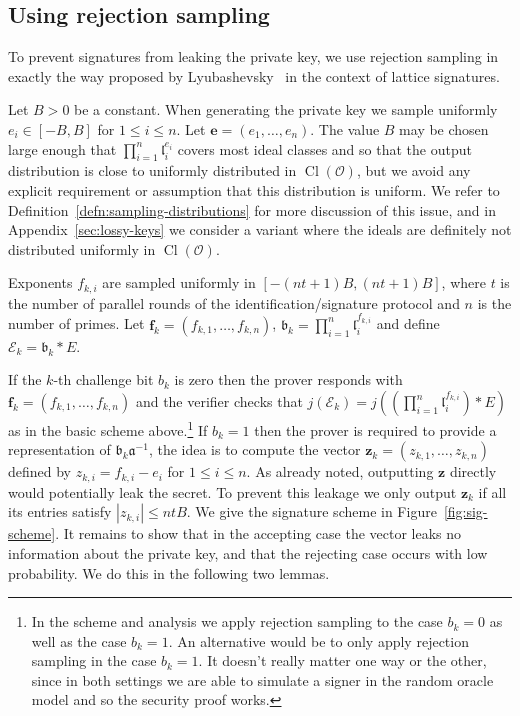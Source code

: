 \documentclass{llncs}
\newcommand{\E}{\mathcal{E}}
\newcommand{\OO}{\mathcal{O}}
\DeclareMathOperator{\Cl}{Cl}
\renewcommand{\a}{\mathfrak{a}}
\renewcommand{\b}{\mathfrak{b}}
\renewcommand{\l}{\mathfrak{l}}
\newcommand{\e}{\mathbf{e}}
\newcommand{\f}{\mathbf{f}}
\newcommand{\z}{\mathbf{z}}
\begin{document}
\subsection{Using rejection sampling}\label{sec:sig-reject-sample}

To prevent signatures from leaking the private key, we use rejection sampling in exactly the way proposed by Lyubashevsky~\cite{Lyu09} in the context of lattice signatures.

Let $B > 0$ be a constant. When generating the private key we sample uniformly $e_i \in [-B, B]$ for $1 \le i \le n$. Let $\e = ( e_1, \dots, e_n )$.
The value $B$ may be chosen large enough that $\prod_{i=1}^n \l_i^{e_i}$ covers most ideal classes and so that the output distribution is close to uniformly distributed in $\Cl(\OO)$, but we avoid any explicit requirement or assumption that this distribution is uniform.
We refer to Definition~\ref{defn:sampling-distributions} for more discussion of this issue, and in Appendix~\ref{sec:lossy-keys} we consider a variant where the ideals are definitely not distributed uniformly in $\Cl(\OO)$.

Exponents $f_{k,i}$ are sampled uniformly in $[-(nt+1)B, (nt+1)B]$, where $t$ is the number of parallel rounds of the identification/signature protocol and $n$ is the number of primes.
Let $\f_k = (f_{k,1}, \dots, f_{k,n} )$, $\b_k = \prod_{i=1}^n \l_i^{f_{k,i}}$ and define $\E_k = \b_k * E $.


If the $k$-th challenge bit $b_k$ is zero then the prover responds with $\f_k = ( f_{k,1}, \dots, f_{k,n} )$ and the verifier checks that $j(\E_k) = j( (\prod_{i=1}^n \l_i^{f_{k,i}}) * E )$ as in the basic scheme above.\footnote{In the scheme and analysis we apply rejection sampling to the case $b_k = 0$ as well as the case $b_k = 1$. An alternative would be to only apply rejection sampling in the case $b_k = 1$. It doesn't really matter one way or the other, since in both settings we are able to simulate a signer in the random oracle model and so the security proof works.}
If $b_k = 1$ then the prover is required to provide a representation of $\b_k \a^{-1}$, the idea is to compute the vector $\z_k = (z_{k,1}, \dots, z_{k,n}) $ defined by $z_{k,i} = f_{k,i} - e_i $ for $1 \le i \le n$.
As already noted, outputting $\z$ directly would potentially leak the secret.
To prevent this leakage we only output $\z_k$ if all its entries satisfy $| z_{k,i} | \le nt B$.
We give the signature scheme in Figure~\ref{fig:sig-scheme}.
It remains to show that in the accepting case the vector leaks no information about the private key, and that the rejecting case occurs with low probability. We do this in the following two lemmas.
\end{document}
